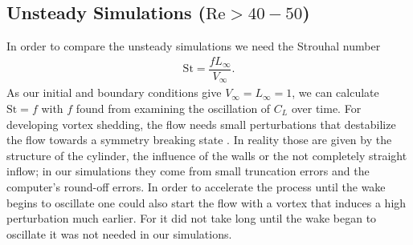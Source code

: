 	\subsection{Unsteady Simulations ($\text{Re}> 40-50$)}
	In order to compare the unsteady simulations we need the Strouhal number
	\begin{align}
		\text{St} = \dfrac{f  L_\infty}{V_\infty}.
	\end{align}
	As our initial and boundary conditions give $V_\infty = L_\infty = 1$, we can calculate $\text{St} = f$ with $f$ found from examining the oscillation of $C_L$ over time. For developing vortex shedding, the flow needs small perturbations that destabilize the flow towards a symmetry breaking state \cite{FLM:14223}. In reality those are given by the structure of the cylinder, the influence of the walls or the not completely straight inflow; in our simulations they come from small truncation errors and the computer's round-off errors. 
	In order to accelerate the process until the wake begins to oscillate one could also start the flow with a vortex that induces a high perturbation much earlier. For it did not take long until the wake began to oscillate it was not needed in our simulations.
